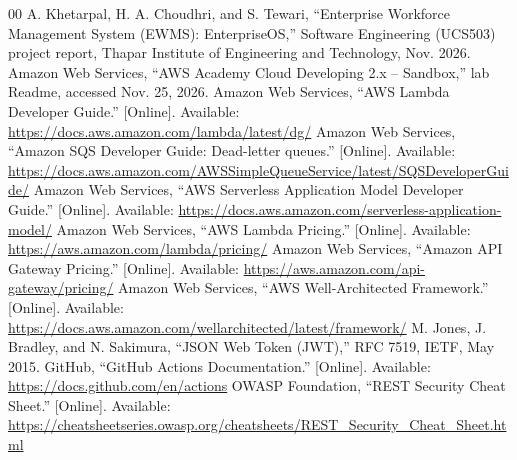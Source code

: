 \documentclass[conference]{IEEEtran}
\begin{document}
\begin{thebibliography}{00}
 A. Khetarpal, H. A. Choudhri, and S. Tewari, ``Enterprise Workforce
Management System (EWMS): EnterpriseOS,'' Software Engineering (UCS503) project report,
Thapar Institute of Engineering and Technology, Nov. 2026.
 Amazon Web Services, ``AWS Academy Cloud Developing 2.x -- Sandbox,''
lab Readme, accessed Nov. 25, 2026.
 Amazon Web Services, ``AWS Lambda Developer Guide.'' [Online]. Available:
\url{https://docs.aws.amazon.com/lambda/latest/dg/}
 Amazon Web Services, ``Amazon SQS Developer Guide: Dead-letter queues.''
[Online]. Available: \url{https://docs.aws.amazon.com/AWSSimpleQueueService/latest/SQSDeveloperGuide/}
 Amazon Web Services, ``AWS Serverless Application Model Developer Guide.''
[Online]. Available: \url{https://docs.aws.amazon.com/serverless-application-model/}
 Amazon Web Services, ``AWS Lambda Pricing.'' [Online]. Available:
\url{https://aws.amazon.com/lambda/pricing/}
 Amazon Web Services, ``Amazon API Gateway Pricing.'' [Online].
Available: \url{https://aws.amazon.com/api-gateway/pricing/}
 Amazon Web Services, ``AWS Well-Architected Framework.'' [Online].
Available: \url{https://docs.aws.amazon.com/wellarchitected/latest/framework/}
 M. Jones, J. Bradley, and N. Sakimura, ``JSON Web Token (JWT),'' RFC 7519,
IETF, May 2015.
 GitHub, ``GitHub Actions Documentation.'' [Online]. Available:
\url{https://docs.github.com/en/actions}
 OWASP Foundation, ``REST Security Cheat Sheet.'' [Online]. Available:
\url{https://cheatsheetseries.owasp.org/cheatsheets/REST_Security_Cheat_Sheet.html}
\end{thebibliography}
\end{document}

